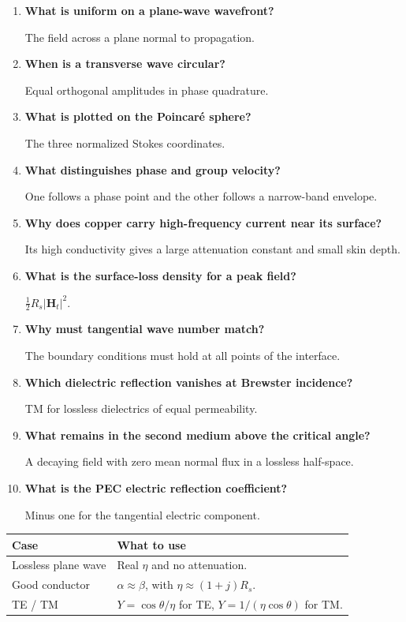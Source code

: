 \documentclass[12pt,a4paper]{article}
\newcommand{\Q}[1]{\textbf{#1}\par\noindent\ignorespaces}
\begin{document}
\begin{tcolorbox}[exambox,title={Frequently Asked / Viva Questions}]
\begin{enumerate}[topsep=0pt, label=\textbf{Q\arabic*.}, itemsep=5pt]
\item \Q{What is uniform on a plane-wave wavefront?}
The field across a plane normal to propagation.
\item \Q{When is a transverse wave circular?}
Equal orthogonal amplitudes in phase quadrature.
\item \Q{What is plotted on the Poincar\'e sphere?}
The three normalized Stokes coordinates.
\item \Q{What distinguishes phase and group velocity?}
One follows a phase point and the other follows a narrow-band envelope.
\item \Q{Why does copper carry high-frequency current near its surface?}
Its high conductivity gives a large attenuation constant and small skin depth.
\item \Q{What is the surface-loss density for a peak field?}
$\tfrac12R_s|\mathbf H_t|^2$.
\item \Q{Why must tangential wave number match?}
The boundary conditions must hold at all points of the interface.
\item \Q{Which dielectric reflection vanishes at Brewster incidence?}
TM for lossless dielectrics of equal permeability.
\item \Q{What remains in the second medium above the critical angle?}
A decaying field with zero mean normal flux in a lossless half-space.
\item \Q{What is the PEC electric reflection coefficient?}
Minus one for the tangential electric component.
\end{enumerate}
\end{tcolorbox}
\begin{tcolorbox}[tikzbox,title={Summary comparison}]
\begin{tabularx}{\linewidth}{|B{4cm}|Y|}\hline
\textbf{Case} & \textbf{What to use} \\ \hline
Lossless plane wave & Real $\eta$ and no attenuation. \\ \hline
Good conductor & $\alpha\approx\beta$, with $\eta\approx(1+j)R_s$. \\ \hline
TE / TM & $Y=\cos\theta/\eta$ for TE, $Y=1/(\eta\cos\theta)$ for TM. \\ \hline
\end{tabularx}
\end{tcolorbox}
\end{document}
